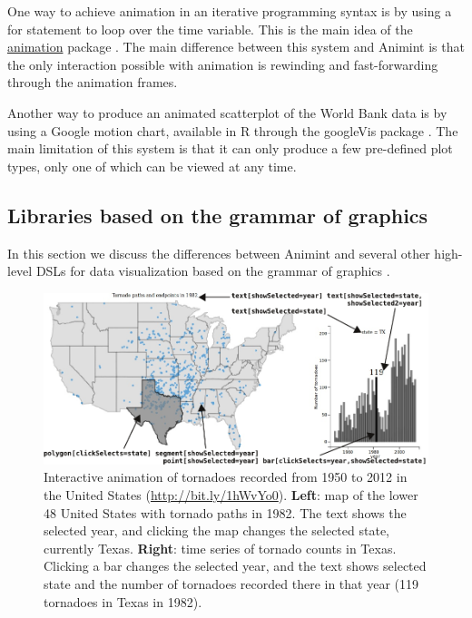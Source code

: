 \documentclass[10pt,journal,compsoc]{IEEEtran}\usepackage[]{graphicx}\usepackage[]{color}
\begin{document}
One way to achieve animation in an iterative programming syntax is by
using a for statement to loop over the time variable. This is the main
idea of the \href{http://yihui.name/animation/}{animation} package
\citep{animation}. The main difference between this system
and Animint is that the only interaction possible with
animation is rewinding and fast-forwarding through the
animation frames.

Another way to produce an animated scatterplot of the World Bank data
is by using a Google motion chart, available in R through the
googleVis package \citep{googleVis}. The main limitation of this
system is that it can only produce a few pre-defined plot types, only one
of which can be viewed at any time.

\subsection{Libraries based on the grammar of graphics}

In this section we discuss the differences between Animint and several
other high-level DSLs for data visualization based on the grammar of
graphics \citep{wilkinson}.

\begin{figure}[p]
  \centering
  \includegraphics[width=\textwidth]{figure-tornado}
  \caption{Interactive animation of tornadoes recorded from 1950 to
    2012 in the United States (\url{http://bit.ly/1hWvYo0}). \textbf{Left}:
    map of the lower 48 United States with tornado paths in 1982. The
    text shows the selected year, and clicking the map changes the
    selected state, currently Texas. \textbf{Right}: time series of
    tornado counts in Texas. Clicking a bar changes the selected year,
    and the text shows selected state and the number of tornadoes
    recorded there in that year (119 tornadoes in Texas in 1982).}
  \label{fig:tornado}
\end{figure}
\end{document}
